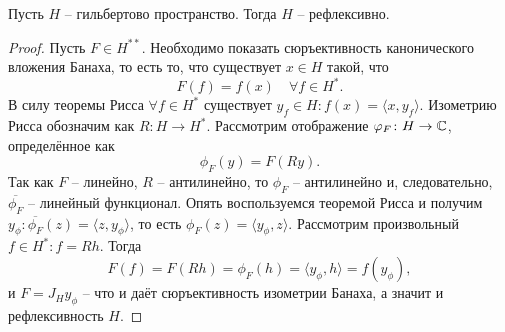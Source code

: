 \begin{theorem}\label{th:hilbert-reflexivity}
    Пусть $H$ -- гильбертово пространство.
    Тогда $H$ -- рефлексивно.
\end{theorem}
\begin{proof}
    Пусть $F \in H^{**}$.
    Необходимо показать сюръективность канонического вложения Банаха, то есть то, что существует $x \in H$ такой, что
    \[
        F(f) = f(x) \quad \forall f \in H^*.
    \]
    В силу теоремы Рисса $\forall f \in H^*$ существует $y_f \in H\colon f(x) = \langle x, y_f\rangle$. Изометрию Рисса обозначим как $R\colon H \to H^*$.
    Рассмотрим отображение $\varphi_F\colon H \to \mathbb{C}$, определённое как
    \[
        \phi_F(y) = F(Ry).
    \]
    Так как $F$ -- линейно, $R$ -- антилинейно, то $\phi_F$ -- антилинейно и, следовательно, $\overline{\phi_F}$ -- линейный функционал.
    Опять воспользуемся теоремой Рисса и получим $y_\phi\colon \overline{\phi_F}(z) = \langle z, y_\phi \rangle$, то есть $\phi_F(z) = \langle y_\phi, z \rangle$.
    Рассмотрим произвольный $f \in H^*\colon f = Rh$.
    Тогда
    \[
        F(f) = F(Rh) = \phi_F(h) = \langle y_\phi, h \rangle = f(y_\phi),
    \]
    и $F = J_H y_\phi$ -- что и даёт сюръективность изометрии Банаха, а значит и рефлексивность $H$.
\end{proof}